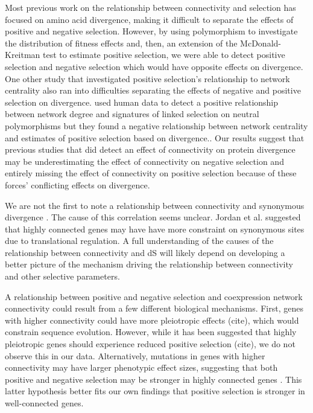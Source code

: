 Most previous work on the relationship between connectivity and selection has focused on amino acid divergence, making it difficult to separate the effects of positive and negative selection. However, by using polymorphism to investigate the distribution of fitness effects and, then, an extension of the McDonald-Kreitman test to estimate positive selection, we were able to detect positive selection and negative selection which would have opposite effects on divergence. One other study that investigated positive selection’s relationship to network centrality also ran into difficulties separating the effects of negative and positive selection on divergence. \citep{Luisi2015-zz} used human data to detect a positive relationship between network degree and signatures of linked selection on neutral polymorphisms but they found a negative relationship between network centrality and estimates of positive selection based on divergence.. Our results suggest that previous studies that did detect an effect of connectivity on protein divergence may be underestimating the effect of connectivity on negative selection and entirely missing the effect of connectivity on positive selection because of these forces’ conflicting effects on divergence.

We are not the first to note a relationship between connectivity and synonymous divergence \citep{Jordan2004-vj}. The cause of this correlation seems unclear. Jordan et al. suggested that highly connected genes may have have more constraint on synonymous sites due to translational regulation. A full understanding of the causes of the relationship between connectivity and dS will likely depend on developing a better picture of the mechanism driving the relationship between connectivity and other selective parameters.

A relationship between positive and negative selection and coexpression network connectivity could result from a few different biological mechanisms. First, genes with higher connectivity could have more pleiotropic effects (cite), which would constrain sequence evolution. However, while it has been suggested that highly pleiotropic genes should experience reduced positive selection (cite), we do not observe this in our data. Alternatively, mutations in genes with higher connectivity may have larger phenotypic effect sizes, suggesting that both positive and negative selection may be stronger in highly connected genes \citep{Olson-Manning2012-ap}. This latter hypothesis better fits our own findings that positive selection is stronger in well-connected genes.

